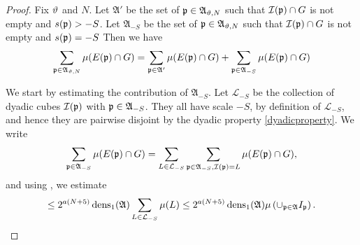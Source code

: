\begin{proof}
{Fix ${\vartheta}$ and $N$. Let
$\mathfrak{A}'$ be the set of ${\mathfrak p}\in\mathfrak{A}_{{\vartheta},N}$ such that ${\mathcal{I}}({\mathfrak p})\cap G$ is not empty and $s({\mathfrak p}) > -S$.
Let $\mathfrak{A}_{-S}$ be the set of ${\mathfrak p}\in\mathfrak{A}_{{\vartheta},N}$ such that ${\mathcal{I}}({\mathfrak p})\cap G$ is not empty and $s({\mathfrak p}) = -S$ }
Then we have
\begin{equation*}
    \sum_{{\mathfrak p}\in\mathfrak{A}_{{\vartheta},N}}\mu(E({\mathfrak p})\cap G) =
    \sum_{{\mathfrak p}\in\mathfrak{A}'}\mu(E({\mathfrak p})\cap G) + \sum_{{\mathfrak p}\in\mathfrak{A}_{-S}}\mu(E({\mathfrak p})\cap G)
\end{equation*}

We start by estimating the contribution of $\mathfrak{A}_{-S}$. Let $\mathcal{L}_{-S}$ be the
collection of dyadic cubes ${\mathcal{I}}({\mathfrak p})$ with ${\mathfrak p} \in \mathfrak{A}_{-S}$. They all have scale $-S$,
by definition of $\mathcal{L}_{-S}$, and hence they are pairwise disjoint by the dyadic property
\eqref{dyadicproperty}. We write
\[
    \sum_{{\mathfrak p}\in\mathfrak{A}_{-S}}\mu(E({\mathfrak p})\cap G)
    = \sum_{L \in \mathcal{L}_{-S}} \sum_{{\mathfrak p}\in\mathfrak{A}_{-S}, {\mathcal{I}}({\mathfrak p}) = L} \mu(E({\mathfrak p})\cap G),
\]
and using , we estimate
\begin{equation}
    \label{eq_minus_S}
    \le 2^{a(N+5)} \operatorname{\operatorname{dens}}_1(\mathfrak{A}) \sum_{L \in \mathcal{L}_{-S}} \mu(L)
    \le 2^{a(N+5)} \operatorname{\operatorname{dens}}_1(\mathfrak{A}) \mu\left(\cup_{{\mathfrak p}\in\mathfrak{A}}I_{{\mathfrak p}}\right).
\end{equation}


\end{proof}
